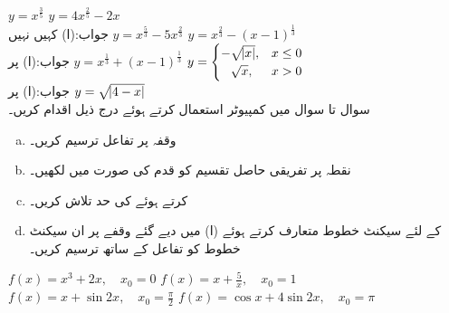 $y=x^{\tfrac{3}{5}}$
$y=4x^{\tfrac{2}{5}}-2x$\\
جواب:\quad (ا) کہیں نہیں
$y=x^{\tfrac{5}{3}}-5x^{\tfrac{2}{3}}$
$y=x^{\tfrac{2}{3}}-(x-1)^{\tfrac{1}{3}}$\\
جواب:\quad  (ا)  پر
$y=x^{\tfrac{1}{3}}+(x-1)^{\tfrac{1}{3}}$
$y=\begin{cases} -\sqrt{\abs{x}},&x\le 0\\  \phantom{-}\sqrt{x},&x>0 \end{cases}$\\
جواب:\quad (ا)  پر
$y=\sqrt{\abs{4-x}}$
\\
سوال  تا سوال  میں کمپیوٹر استعمال کرتے ہوئے درج ذیل اقدام کریں۔
\begin{enumerate}[a.]
\item
وقفہ  پر تفاعل  ترسیم کریں۔
\item
نقطہ  پر تفریقی حاصل تقسیم  کو قدم  کی صورت میں لکھیں۔
\item
{} کرتے ہوئے  کی حد تلاش کریں۔
\item
{} کے لئے سیکنٹ خطوط  متعارف کرتے ہوئے (ا) میں دیے گئے وقفے پر ان سیکنٹ خطوط کو  تفاعل  کے ساتھ ترسیم کریں۔
\end{enumerate}

$f(x)=x^3+2x,\quad x_0=0$
$f(x)=x+\tfrac{5}{x},\quad x_0=1$
$f(x)=x+\sin 2x,\quad x_0=\tfrac{\pi}{2}$
$f(x)=\cos x+4\sin 2x,\quad x_0=\pi$
